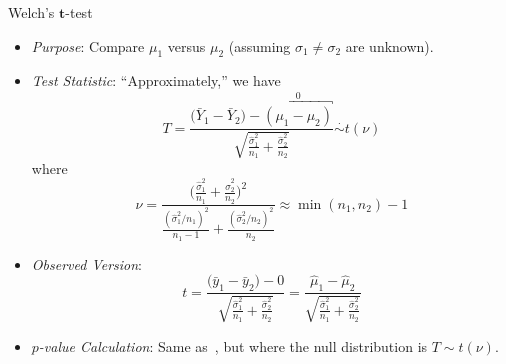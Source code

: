 \begin{Statistical_Test}{Welch's $ \symbf{t} $-test}{}
      \begin{itemize}
            \item \emph{Purpose}: Compare $ \mu_1 $ versus $ \mu_2 $ (assuming $ \sigma_1\ne\sigma_2 $ are unknown).
            \item \emph{Test Statistic}: ``Approximately,'' we have
                  \[ T=\frac{\bigl(\bar{Y}_1-\bar{Y}_2\bigr)-\overbracket{(\mu_1-\mu_2)}^0}{\displaystyle \sqrt{\frac{\hat{\sigma}_1^2}{n_1}+\frac{\hat{\sigma}_2^2}{n_2}}}\stackrel{\cdot}{\sim} t(\nu) \]
                  where
                  \[ \nu=\frac{
                              \displaystyle \biggl(\frac{\hat{\sigma}_1^2}{n_1}+\frac{\hat{\sigma}_2^2}{n_2} \biggr)^{\!2}
                        }{
                              \displaystyle \frac{(\hat{\sigma}_1^2/n_1)^2}{n_1-1}+\frac{(\hat{\sigma}_2^2/n_2)^2}{n_2}
                        }\approx \min(n_1,n_2)-1  \]
            \item \emph{Observed Version}:
                  \[ t=\frac{\bigl(\bar{y}_1-\bar{y}_2\bigr)-0}{\displaystyle \sqrt{\frac{\hat{\sigma}_1^2}{n_1}+\frac{\hat{\sigma}_2^2}{n_2}}}=\frac{\hat{\mu}_1-\hat{\mu}_2}{\displaystyle \sqrt{\frac{\hat{\sigma}_1^2}{n_1}+\frac{\hat{\sigma}_2^2}{n_2}}}  \]
            \item \emph{$ p $-value Calculation}: Same as~, but where
                  the null distribution is $ T \sim t(\nu) $.
      \end{itemize}
\end{Statistical_Test}
